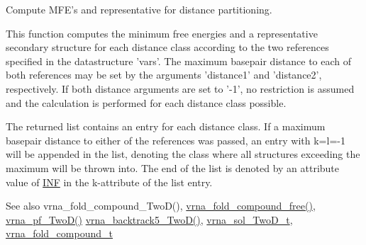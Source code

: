 Compute M\+F\+E's and representative for distance partitioning. 

This function computes the minimum free energies and a representative secondary structure for each distance class according to the two references specified in the datastructure 'vars'. The maximum basepair distance to each of both references may be set by the arguments 'distance1' and 'distance2', respectively. If both distance arguments are set to '-\/1', no restriction is assumed and the calculation is performed for each distance class possible.

The returned list contains an entry for each distance class. If a maximum basepair distance to either of the references was passed, an entry with k=l=-\/1 will be appended in the list, denoting the class where all structures exceeding the maximum will be thrown into. The end of the list is denoted by an attribute value of \hyperlink{energy__const_8h_a12c2040f25d8e3a7b9e1c2024c618cb6}{I\+N\+F} in the k-\/attribute of the list entry.

\begin{DoxySeeAlso}{See also}
vrna\+\_\+fold\+\_\+compound\+\_\+\+Two\+D(), \hyperlink{group__fold__compound_gadded6039d63f5d6509836e20321534ad}{vrna\+\_\+fold\+\_\+compound\+\_\+free()}, \hyperlink{group__kl__neighborhood__pf_ga0bc3427689bd09da09b8b3094a27f836}{vrna\+\_\+pf\+\_\+\+Two\+D()} \hyperlink{group__kl__neighborhood__mfe_ga15a96fc96f4f4c2e01a11b3e17d1ef43}{vrna\+\_\+backtrack5\+\_\+\+Two\+D()}, \hyperlink{group__kl__neighborhood__mfe_structvrna__sol__TwoD__t}{vrna\+\_\+sol\+\_\+\+Two\+D\+\_\+t}, \hyperlink{group__fold__compound_ga1b0cef17fd40466cef5968eaeeff6166}{vrna\+\_\+fold\+\_\+compound\+\_\+t}
\end{DoxySeeAlso}

